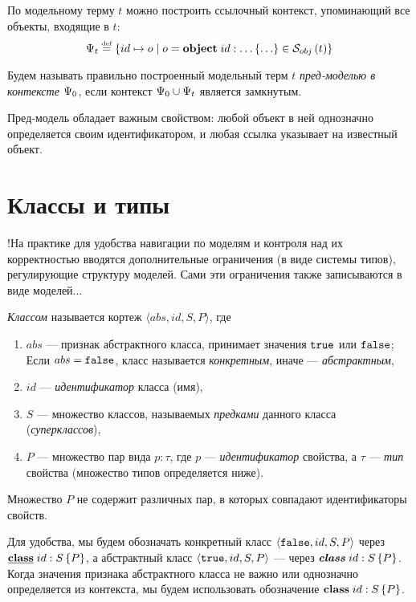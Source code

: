 По модельному терму $t$ можно построить ссылочный контекст, упоминающий все объекты, входящие в $t$:
$$
	\Psi_t \stackrel{\text{\tiny def}}{=} \left\{ id \mapsto o \;|\; o = \mathbf{object}\;id : \ldots\left\{ \ldots \right\} \in \mathcal{S}_{obj}\left(t\right)\right\}
$$

\begin{Def}
Будем называть правильно построенный модельный терм $t$ \emph{пред-моделью в контексте $\Psi_0$}, если контекст $\Psi_0 \cup \Psi_t$ является замкнутым.
\end{Def}

Пред-модель обладает важным свойством: любой объект в ней однозначно определяется своим идентификатором, и любая ссылка указывает на известный объект.

\section{Классы и типы}

!На практике для удобства навигации по моделям и контроля над их корректностью вводятся дополнительные ограничения (в виде системы типов), регулирующие структуру моделей. Сами эти ограничения также записываются в виде моделей...

\begin{Def}[Класс]\label{defclass}
\emph{Классом} называется кортеж $\langle abs, id, S, P \rangle$, где 
\begin{enumerate}
\item $abs$ --- признак абстрактного класса, принимает значения $\mathtt{true}$ или $\mathtt{false}$; Если $abs = \mathtt{false}$, класс называется \emph{конкретным}, иначе --- \emph{абстрактным},
\item $id$ --- \emph{идентификатор} класса (имя),
\item $S$ --- множество классов, называемых \emph{предками} данного класса (\emph{суперклассов}),
\item $P$ --- множество пар вида $p : \tau$, где $p$ --- \emph{идентификатор} свойства, а $\tau$ --- \emph{тип} свойства (множество типов определяется ниже).
\end{enumerate}
Множество $P$ не содержит различных пар, в которых совпадают идентификаторы свойств.
\end{Def}

Для удобства, мы будем обозначать конкретный класс $\langle \mathtt{false}, id, S, P \rangle$ через \mbox{$\underline{\mathbf{class}}\;id : S \left\{P\right\}$}, а абстрактный класс $\langle \mathtt{true}, id, S, P \rangle$ --- через \mbox{$\mbox{\textbf{\textit{class}}}\;id : S \left\{P\right\}$}. Когда значения признака абстрактного класса не важно или однозначно определяется из контекста, мы будем использовать обозначение \mbox{$\mathbf{class}\;id : S \left\{P\right\}$}.

